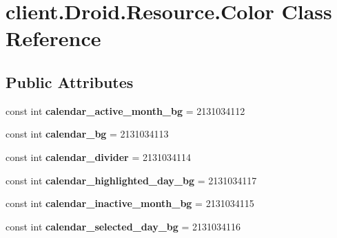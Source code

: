 \hypertarget{classclient_1_1Droid_1_1Resource_1_1Color}{\section{client.\-Droid.\-Resource.\-Color Class Reference}
\label{classclient_1_1Droid_1_1Resource_1_1Color}
}
\subsection*{Public Attributes}
\begin{DoxyCompactItemize}
\item 
\hypertarget{classclient_1_1Droid_1_1Resource_1_1Color_abb05a40b34a7751b6d565bcada614f6c}{const int {\bfseries calendar\-\_\-active\-\_\-month\-\_\-bg} = 2131034112}\label{classclient_1_1Droid_1_1Resource_1_1Color_abb05a40b34a7751b6d565bcada614f6c}

\item 
\hypertarget{classclient_1_1Droid_1_1Resource_1_1Color_add1dca31d33f65edf8c781cfc18dda6f}{const int {\bfseries calendar\-\_\-bg} = 2131034113}\label{classclient_1_1Droid_1_1Resource_1_1Color_add1dca31d33f65edf8c781cfc18dda6f}

\item 
\hypertarget{classclient_1_1Droid_1_1Resource_1_1Color_a0f3f13f8233eb0cc8976a589af67fa06}{const int {\bfseries calendar\-\_\-divider} = 2131034114}\label{classclient_1_1Droid_1_1Resource_1_1Color_a0f3f13f8233eb0cc8976a589af67fa06}

\item 
\hypertarget{classclient_1_1Droid_1_1Resource_1_1Color_afa2c4f8a535b47f7a6681ef7c381a4b0}{const int {\bfseries calendar\-\_\-highlighted\-\_\-day\-\_\-bg} = 2131034117}\label{classclient_1_1Droid_1_1Resource_1_1Color_afa2c4f8a535b47f7a6681ef7c381a4b0}

\item 
\hypertarget{classclient_1_1Droid_1_1Resource_1_1Color_a643ff3a00bf9da24ba0048b3e4204f40}{const int {\bfseries calendar\-\_\-inactive\-\_\-month\-\_\-bg} = 2131034115}\label{classclient_1_1Droid_1_1Resource_1_1Color_a643ff3a00bf9da24ba0048b3e4204f40}

\item 
\hypertarget{classclient_1_1Droid_1_1Resource_1_1Color_a8b6d23df6f9cfc9310e5acd43e78e4d9}{const int {\bfseries calendar\-\_\-selected\-\_\-day\-\_\-bg} = 2131034116}\label{classclient_1_1Droid_1_1Resource_1_1Color_a8b6d23df6f9cfc9310e5acd43e78e4d9}


\end{DoxyCompactItemize}
